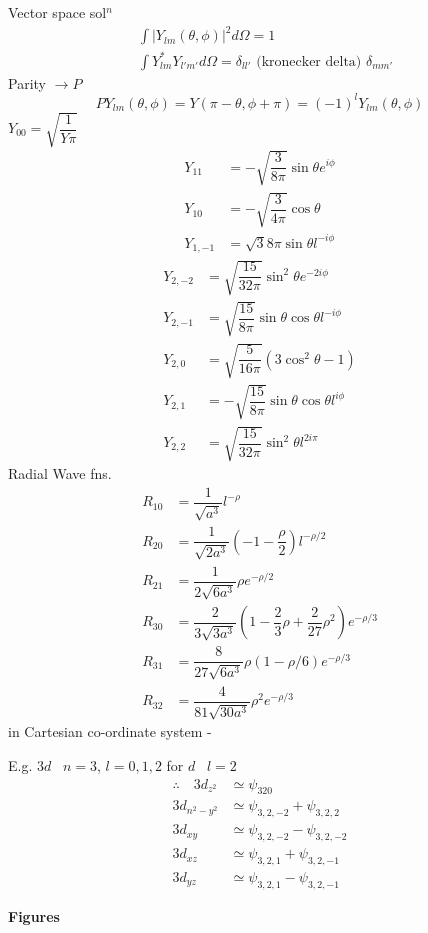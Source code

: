 Vector space sol$^{n}$
\begin{align*}
& \int |Y_{lm}(\theta,\phi)|^{2}d\Omega = 1\\[3pt]
& \int Y^{*}_{lm}Y_{l'm'}d\Omega=\delta_{ll'}\text{ (kronecker delta) } \delta_{mm'}
\end{align*}
Parity $\to P$
$$
P Y_{lm}(\theta,\phi)=Y(\pi-\theta,\phi+\pi)=(-1)^{l}Y_{lm}(\theta,\phi)
$$
$Y_{00}=\sqrt{\dfrac{1}{Y\pi}}$
\begin{align*}
Y_{11} &= -\sqrt{\dfrac{3}{8\pi}}\sin\theta e^{i\phi}\\[3pt]
Y_{10} &= -\sqrt{\dfrac{3}{4\pi}}\cos\theta\\[3pt]
Y_{1,-1} &= \sqrt{3}{8\pi}\sin\theta l^{-i\phi}
\end{align*}
\begin{align*}
Y_{2,-2} &= \sqrt{\dfrac{15}{32\pi}}\sin^{2}\theta e^{-2i\phi}\\[3pt]
Y_{2,-1} &= \sqrt{\dfrac{15}{8\pi}}\sin\theta \cos \theta l^{-i\phi}\\[3pt]
Y_{2,0} &= \sqrt{\dfrac{5}{16\pi}}(3\cos^{2}\theta-1)\\[3pt]
Y_{2,1} &= -\sqrt{\dfrac{15}{8\pi}}\sin \theta\cos \theta l^{i\phi}\\[3pt]
Y_{2,2} &= \sqrt{\dfrac{15}{32\pi}}\sin^{2}\theta l^{2i\pi}
\end{align*}
Radial Wave fns.
\begin{align*}
R_{10} &= \dfrac{1}{\sqrt{a^{3}}}l^{-\rho}\\[3pt]
R_{20} &= \dfrac{1}{\sqrt{2a^3}}\left(-1-\dfrac{\rho}{2}\right)l^{-\rho/2}\\[3pt]
R_{21} &= \dfrac{1}{2\sqrt{6a^3}}\rho e^{-\rho/2}\\[3pt]
R_{30} &= \dfrac{2}{3\sqrt{3a^{3}}}\left(1-\dfrac{2}{3}\rho +\dfrac{2}{27}\rho^{2}\right)e^{-\rho/3}\\[3pt]
R_{31} &= \dfrac{8}{27\sqrt{6a^{3}}}\rho \left(1-\rho/6\right)e^{-\rho/3}\\[3pt]
R_{32} &= \dfrac{4}{81\sqrt{30a^{3}}}\rho^{2}e^{-\rho/3}
\end{align*}
in Cartesian co-ordinate system -

E.g. $3d$ \ $n=3$, $l=0,1,2$ for $d$ \ $l=2$
\begin{align*}
\therefore\quad 3 d_{z^{2}} &\simeq \psi_{320}\\[3pt]
3d_{n^{2}-y^{2}} &\simeq \psi_{3,2,-2}+\psi_{3,2,2}\\[3pt]
3d_{xy} &\simeq \psi_{3,2,-2}-\psi_{3,2,-2}\\[3pt]
3d_{xz} &\simeq \psi_{3,2,1}+\psi_{3,2,-1}\\[3pt]
3d_{yz} &\simeq \psi_{3,2,1}-\psi_{3,2,-1}
\end{align*}
\begin{center}
{\bf Figures}
\end{center}
